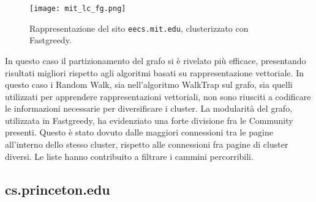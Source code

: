 \begin{figure}[ht!]
	\centering
	\texttt{[image: mit\_lc\_fg.png]}
	\caption{Rappresentazione del sito \texttt{eecs.mit.edu}, clusterizzato con Fastgreedy.}
	\label{lc_embText_km}
\end{figure}


In questo caso il partizionamento del grafo si è rivelato più efficace, presentando risultati migliori rispetto agli algoritmi basati su rappresentazione vettoriale. In questo caso i Random Walk, sia nell'algoritmo WalkTrap sul grafo, sia quelli utilizzati per apprendere rappresentazioni vettoriali, non sono riusciti a codificare le informazioni necessarie per diversificare i cluster. La modularità del grafo, utilizzata in Fastgreedy, ha evidenziato una forte divisione fra le Community presenti. Questo è stato dovuto dalle maggiori connessioni tra le pagine all'interno dello stesso cluster, rispetto alle connessioni fra pagine di cluster diversi. Le liste hanno contribuito a filtrare i cammini percorribili.

\subsection{cs.princeton.edu}

